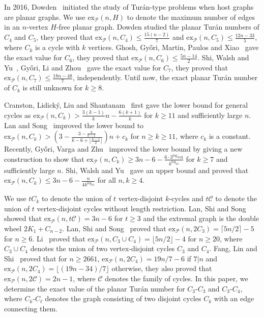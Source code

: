 \documentclass[12pt]{article}
\newcommand{\ex}{\mathrm{ex}}
\begin{document}
In 2016, Dowden~\cite{dowden2016} initiated the study of Tur\'an-type problems when host graphs are planar graphs. We use $\ex_{\mathcal{P}}(n,H)$ to denote the maximum number of edges in an $n$-vertex $H$-free planar graph. Dowden studied the planar Tur\'an numbers of $C_{4}$ and $C_{5}$, they proved that $\ex_{\mathcal{P}}(n,C_4) \leq \frac{15(n-2)}{7}$ and $\ex_{\mathcal{P}}(n,C_5) \leq \frac{12n-33}{5}$, where $C_{k}$ is a cycle with $k$ vertices. Ghosh, Gy\H{o}ri, Martin, Paulos and Xiao~\cite{ghosh2022c6} gave the exact value for $C_{6}$, they proved that $\ex_{\mathcal{P}}(n,C_6) \leq \frac{5n-14}{2}$. Shi, Walsh and Yu~\cite{shi2025planar}, Gy\H{o}ri, Li and Zhou~\cite{győri2023c7} gave the exact value for $C_{7}$, they proved that $\ex_{\mathcal{P}}(n,C_7) \leq \frac{18n-48}{7}$, independently. Until now, the exact planar Tur\'an number of $C_{k}$ is still unknown for $k\geq 8$.

Cranston, Lidick\'{y}, Liu and Shantanam~\cite{daniel2022counterexample} first gave the lower bound for general cycles as $\ex_{\mathcal{P}}(n,C_k) > \frac{3(k-1)}{k}n-\frac{6(k+1)}{k}$ for $k\geq 11$ and sufficiently large $n$. Lan and Song~\cite{lan2022improved} improved the lower bound to $\ex_{\mathcal{P}}(n,C_{k}) > (3-\frac{3-\frac{2}{k-1}}{k-6+\lfloor \frac{k-1}{2}\rfloor})n+c_{k}$ for $n\geq k\geq 11$, where $c_{k}$ is a constant. Recently, Gy\H{o}ri, Varga and Zhu~\cite{gyHori2024new} improved the lower bound by giving a new construction to show that $\ex_{\mathcal{P}}(n,C_{k}) \geq 3n-6-\frac{6\cdot3^{\log_23}n}{k^{\log_23}}$ for $k\geq 7$ and sufficiently large $n$. Shi, Walsh and Yu~\cite{shi2025dense} gave an upper bound and proved that $\ex_{\mathcal{P}}(n,C_{k}) \leq 3n-6-\frac{n}{4k^{\log_23}}$ for all $n,k\geq4$.

We use $tC_{k}$ to denote the union of $t$ vertex-disjoint $k$-cycles and $t\mathcal{C}$ to denote the union of $t$ vertex-disjoint cycles without length restriction. Lan, Shi and Song~\cite{lan2019hfree} showed that $\ex_{\mathcal{P}}(n,t\mathcal{C})=3n-6$ for $t\geq 3$ and the extremal graph is the double wheel $2K_{1}+C_{n-2}$.  Lan, Shi and Song~\cite{lan2024planar} proved that $\ex_{\mathcal{P}}(n,2C_{3})=\lceil 5n/2 \rceil - 5$ for $n\geq 6$. Li~\cite{li2024} proved that $\ex_{\mathcal{P}}(n,C_{3}\cup C_{4})=\lfloor 5n/2 \rfloor - 4$ for $n\geq 20$, where $C_3\cup C_4$ denotes the union of two vertex-disjoint cycles $C_3$ and $C_4$. Fang, Lin and Shi~\cite{fang2024} proved that for $n\geq 2661$, $\ex_{\mathcal{P}}(n,2C_{4})=19n/7 - 6$ if $7|n$ and $\ex_{\mathcal{P}}(n,2C_{4})=\lfloor (19n-34)/7 \rfloor$ otherwise, they also proved that  $\ex_{\mathcal{P}}(n,2\mathcal{C})=2n-1$, where $\mathcal{C}$ denotes the family of cycles.
In this paper, we determine the exact value of the planar Tur\'an number for $C_3\text{-}C_3$ and $C_3\text{-}C_4$, where $C_{k}\text{-}C_{\ell}$ denotes the graph consisting of two disjoint cycles $C_k$ with an edge connecting them.
\end{document}
